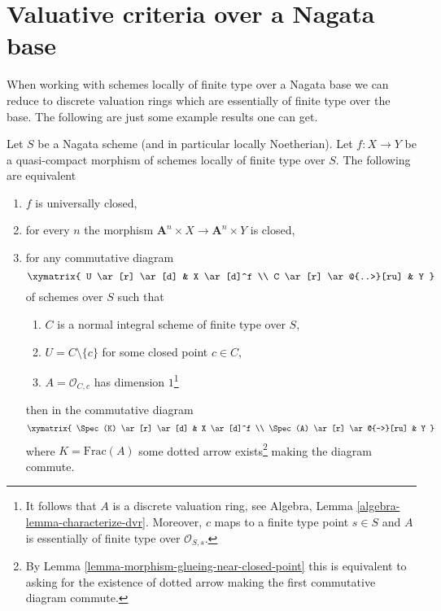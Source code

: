 \section{Valuative criteria over a Nagata base}
\label{section-nagata-valuative}

\noindent
When working with schemes locally of finite type over a
Nagata base we can reduce to discrete valuation rings
which are essentially of finite type over the base.
The following are just some example results one can get.

\begin{lemma}
\label{lemma-essentially-finite-type-criterion-universally-closed}
Let $S$ be a Nagata scheme (and in particular locally Noetherian).
Let $f : X \to Y$ be a quasi-compact morphism of schemes locally
of finite type over $S$. The following are equivalent
\begin{enumerate}
\item $f$ is universally closed,
\item for every $n$ the morphism
$\mathbf{A}^n \times X \to \mathbf{A}^n \times Y$ is closed,
\item for any commutative diagram
$$
\xymatrix{
U \ar[r] \ar[d] & X \ar[d]^f \\
C \ar[r] \ar@{..>}[ru] & Y
}
$$
of schemes over $S$ such that
\begin{enumerate}
\item $C$ is a normal integral scheme of finite type over $S$,
\item $U = C \setminus \{c\}$ for some closed point $c \in C$,
\item $A = \mathcal{O}_{C, c}$ has dimension $1$\footnote{It follows
that $A$ is a discrete valuation ring, see
Algebra, Lemma \ref{algebra-lemma-characterize-dvr}.
Moreover, $c$ maps to a finite type point $s \in S$ and
$A$ is essentially of finite type over $\mathcal{O}_{S, s}$.}
\end{enumerate}
then in the commutative diagram
$$
\xymatrix{
\Spec(K) \ar[r] \ar[d] & X \ar[d]^f \\
\Spec(A) \ar[r] \ar@{-->}[ru] & Y
}
$$
where $K = \text{Frac}(A)$ some dotted arrow exists\footnote{By
Lemma \ref{lemma-morphism-glueing-near-closed-point} this is
equivalent to asking for the existence of dotted arrow
making the first commutative diagram commute.}
making the diagram commute.
\end{enumerate}
\end{lemma}

